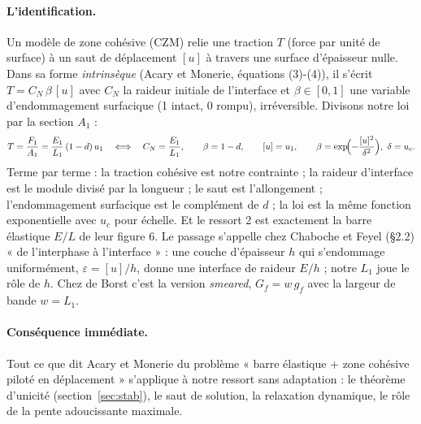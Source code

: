 \documentclass[11pt,a4paper]{article}
\newcommand{\uc}{u_c}
\begin{document}
\paragraph{L'identification.} Un modèle de zone cohésive (CZM) relie une traction $T$
(force par unité de surface) à un saut de déplacement $[u]$ à travers une surface d'épaisseur
nulle. Dans sa forme \emph{intrinsèque} (Acary et Monerie, équations (3)-(4)), il s'écrit
$T = C_N\,\beta\,[u]$ avec $C_N$ la raideur initiale de l'interface et $\beta\in[0,1]$ une variable
d'endommagement surfacique (1 intact, 0 rompu), irréversible. Divisons notre loi par la
section $A_1$ :
\begin{equation}
  T = \frac{F_1}{A_1} = \frac{E_1}{L_1}\,(1-d)\,u_1
  \quad\Longleftrightarrow\quad
  C_N = \frac{E_1}{L_1},\qquad \beta = 1-d,\qquad [u] = u_1,\qquad
  \beta = \exp\!\Bigl(-\frac{[u]^2}{\delta^2}\Bigr),\ \delta = \uc .
\end{equation}
Terme par terme : la traction cohésive est notre contrainte ; la raideur d'interface est le
module divisé par la longueur ; le saut est l'allongement ; l'endommagement surfacique est le
complément de $d$ ; la loi est la même fonction exponentielle avec $\uc$ pour échelle. Et le
ressort 2 est exactement la barre élastique $E/L$ de leur figure 6. Le passage s'appelle chez
Chaboche et Feyel (§2.2) « de l'interphase à l'interface » : une couche d'épaisseur $h$ qui
s'endommage uniformément, $\varepsilon = [u]/h$, donne une interface de raideur $E/h$ ; notre
$L_1$ joue le rôle de $h$. Chez de Borst c'est la version \emph{smeared}, $G_f = w\,g_f$ avec la
largeur de bande $w = L_1$.

\paragraph{Conséquence immédiate.} Tout ce que dit Acary et Monerie du problème « barre
élastique + zone cohésive piloté en déplacement » s'applique à notre ressort sans
adaptation : le théorème d'unicité (section~\ref{sec:stab}), le saut de solution, la
relaxation dynamique, le rôle de la pente adoucissante maximale.
\end{document}
